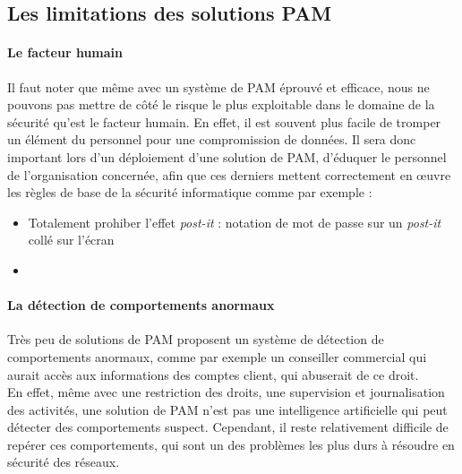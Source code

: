 \subsection{Les limitations des solutions PAM}

\paragraph{Le facteur humain} Il faut noter que même avec un système de PAM éprouvé et efficace, nous ne pouvons pas mettre de côté le risque le plus exploitable dans le domaine de la sécurité qu'est le facteur humain. En effet, il est souvent plus facile de tromper un élément du personnel pour une compromission de données. Il sera donc important lors d'un déploiement d'une solution de PAM, d'éduquer le personnel de l'organisation concernée, afin que ces derniers mettent correctement en œuvre les règles de base de la sécurité informatique comme par exemple :
\begin{itemize}
	\item Totalement prohiber \og l'effet \textit{post-it} \fg{} : notation de mot de passe sur un \textit{post-it} collé sur l'écran
	\item  
\end{itemize}

\paragraph{La détection de comportements anormaux}
Très peu de solutions de PAM proposent un système de détection de comportements anormaux, comme par exemple un conseiller commercial qui aurait accès aux informations des comptes client, qui abuserait de ce droit.\\
En effet, même avec une restriction des droits, une supervision et journalisation des activités, une solution de PAM n'est pas une intelligence artificielle qui peut détecter des comportements suspect. Cependant, il reste relativement difficile de repérer ces comportements, qui sont un des problèmes les plus durs à résoudre en sécurité des réseaux.

